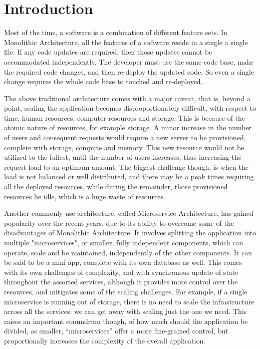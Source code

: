 %
%
\chapter{Introduction}
Most of the time, a software is a combination of different feature sets. In Monolithic Architecture, 
all the features of a software reside in a single a single file. If any code updates are required, 
then those updates cannot be accommodated independently. The developer must use the same code base, 
make the required code changes, and then re-deploy the updated code. So even a single change requires 
the whole code base to touched and re-deployed. 

\smallskip

The above traditional architecture comes with a major caveat, that is, beyond a point, scaling the application 
becomes disproportionately difficult, with respect to time, human resources, computer resources and storage. 
This is because of the atomic nature of resources, for example storage. A minor increase in the number of users 
and consequent requests would require a new server to be provisioned, complete with storage, compute and memory. 
This new resource would not be utilized to the fullest, until the number of users increases, thus increasing 
the request load to an optimum amount. The biggest challenge though, is when the load is not balanced or well distributed, 
and there may be a peak times requiring all the deployed resources, while during the remainder, those provisioned resources 
lie idle, which is a huge waste of resources. 

\smallskip

Another commonly use architecture, called Microservice Architecture, has gained popularity over the recent years, 
due to its ability to overcome some of the disadvantages of Monolithic Architecture. It involves splitting the application 
into multiple "microservices", or smaller, fully independent components, which can operate, scale and be maintained, 
independently of the other components. It can be said to be a mini app, complete with its own database as well. 
This comes with its own challenges of complexity, and with synchronous update of state throughout the assorted services, 
although it provides more control over the resources, and mitigates some of the scaling challenges. For example, 
if a single microservice is running out of storage, there is no need to scale the infrastructure across all the services, 
we can get away with scaling just the one we need. This raises an important conundrum though, of how much should the
application be divided, as smaller, “microservices” offer a more fine-grained control, but proportionally increases the 
complexity of the overall application. 


